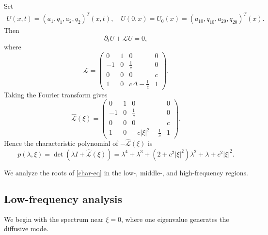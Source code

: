 \documentclass[10pt,reqno]{amsart}
\numberwithin{equation}{section}
\begin{document}
Set
\begin{align*}
U(x,t)=(a_1,q_1,a_2,q_2)^T(x,t),\quad
U(0,x)=U_0(x)=(a_{10},q_{10},a_{20},q_{20})^T(x).
\end{align*}
Then
\begin{equation}\label{lin-matrix}
\partial_t U+\mathcal{L}U=0,
\end{equation}
where
\[%
\mathcal{L}=\begin{pmatrix}
0&1&0&0\\
-1&0&\frac{1}{c}&0\\
0&0&0&c\\
1&0&c\Delta-\frac{1}{c}&1
\end{pmatrix}.
\]%
Taking the Fourier transform gives
\[%
\widehat{\mathcal{L}}(\xi)=\begin{pmatrix}
0&1&0&0\\
-1&0&\frac{1}{c}&0\\
0&0&0&c\\
1&0&-c|\xi|^2-\frac{1}{c}&1
\end{pmatrix}.
\]%
Hence the characteristic polynomial of $-\widehat{\mathcal{L}}(\xi)$ is
\begin{equation}\label{char-eq}
p(\lambda,\xi) =\det\left(\lambda I+\widehat{\mathcal{L}}(\xi)\right) =\lambda^4+\lambda^3+\left(2+c^2|\xi|^2\right)\lambda^2+\lambda+c^2|\xi|^2.
\end{equation}

We analyze the roots of \eqref{char-eq} in the low-, middle-, and high-frequency regions.




\subsection{Low-frequency analysis}
We begin with the spectrum near $\xi=0$, where one eigenvalue generates the diffusive mode.
\end{document}
